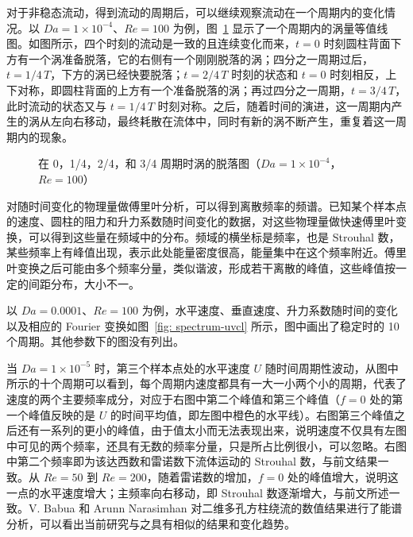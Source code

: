 对于非稳态流动，得到流动的周期后，可以继续观察流动在一个周期内的变化情况。以 $Da=1\times 10^{-4}$、$Re=100$ 为例，图~\ref{fig: 4*vortex} 显示了一个周期内的涡量等值线图。如图所示，四个时刻的流动是一致的且连续变化而来，$t=0$ 时刻圆柱背面下方有一个涡准备脱落，它的右侧有一个刚刚脱落的涡；四分之一周期过后，$t=1/4\,T$，下方的涡已经快要脱落；$t=2/4\,T$ 时刻的状态和 $t=0$ 时刻相反，上下对称，即圆柱背面的上方有一个准备脱落的涡；再过四分之一周期，$t=3/4\,T$，此时流动的状态又与 $t=1/4\,T$ 时刻对称。之后，随着时间的演进，这一周期内产生的涡从左向右移动，最终耗散在流体中，同时有新的涡不断产生，重复着这一周期内的现象。

\begin{figure}
	\centering
	\begin{minipage}{\textwidth}
		\centering
	\end{minipage}
	\centering
	\begin{minipage}{\textwidth}
		\centering
	\end{minipage}
	\caption{在 0，1/4，2/4，和 3/4 周期时涡的脱落图（$Da=1\times 10^{-4}$，$Re=100$）}
	\label{fig: 4*vortex}
\end{figure}

对随时间变化的物理量做傅里叶分析，可以得到离散频率的频谱。已知某个样本点的速度、圆柱的阻力和升力系数随时间变化的数据，对这些物理量做快速傅里叶变换，可以得到这些量在频域中的分布。频域的横坐标是频率，也是 Strouhal 数，某些频率上有峰值出现，表示此处能量密度很高，能量集中在这个频率附近。傅里叶变换之后可能由多个频率分量，类似谐波，形成若干离散的峰值，这些峰值按一定的间距分布，大小不一。%

以 $Da=0.0001$、$Re=100$ 为例，水平速度、垂直速度、升力系数随时间的变化以及相应的 Fourier 变换如图~\ref{fig: spectrum-uvcl} 所示，图中画出了稳定时的 10 个周期。其他参数下的图没有列出。

当 $Da=1\times 10^{-5}$ 时，第三个样本点处的水平速度 $U$ 随时间周期性波动，从图中所示的十个周期可以看到，每个周期内速度都具有一大一小两个小的周期，代表了速度的两个主要频率成分，对应于右图中第二个峰值和第三个峰值（$f=0$ 处的第一个峰值反映的是 $U$ 的时间平均值，即左图中橙色的水平线）。右图第三个峰值之后还有一系列的更小的峰值，由于值太小而无法表现出来，说明速度不仅具有左图中可见的两个频率，还具有无数的频率分量，只是所占比例很小，可以忽略。右图中第二个频率即为该达西数和雷诺数下流体运动的 Strouhal 数，与前文结果一致。从 $Re=50$ 到 $Re=200$，随着雷诺数的增加，$f=0$ 处的峰值增大，说明这一点的水平速度增大；主频率向右移动，即 Strouhal 数逐渐增大，与前文所述一致。V. Babua 和 Arunn Narasimhan \cite{Babu2010} 对二维多孔方柱绕流的数值结果进行了能谱分析，可以看出当前研究与之具有相似的结果和变化趋势。

